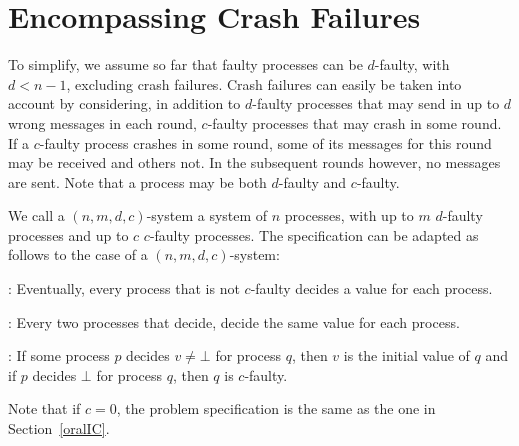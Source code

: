 \section{Encompassing Crash Failures}\label{crash}
To simplify, we assume so far that faulty processes can be 
$d$-faulty, with $d < n-1$, excluding crash failures. 
Crash failures  can easily be taken into account by considering, in addition to $d$-faulty processes that may send in  up to $d$ wrong messages in each round, 
$c$-faulty processes that may crash in some round. If a
$c$-faulty process crashes in some round, some of its messages for this round
may be received and  others not. In the subsequent rounds however, no messages are 
sent.   Note that a process may be both $d$-faulty and $c$-faulty.

We call a $( n,m,d,c )$-system a system of $n$ processes, with up to $m$
$d$-faulty processes and up to $c$ $c$-faulty processes.
The   specification can be adapted as follows to the 
case of a  $( n,m,d,c)$-system:
  \begin{itemizedot}
    \item {}: Eventually, every process that is not $c$-faulty
     decides a value for each process.
    
    \item {}: Every two processes that decide,
    decide the same value for each process.
    
    \item {}: If some process $p$ decides $v\neq \bot $ for process $q$, then
           $v$ is the initial value of $q$ and if $p$ decides $\bot$
           for process $q$, then $q$ is $c$-faulty.
  \end{itemizedot}
Note that if $c=0$,  the problem specification is the same as
the one in Section~\ref{oralIC}.

